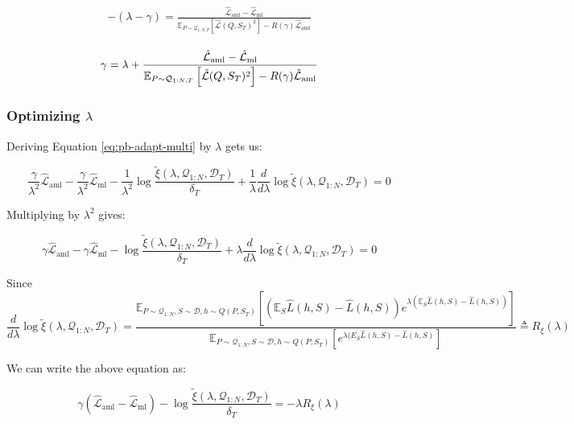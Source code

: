 \documentclass{article}
\theoremstyle{definition}
\newcommand{\Expect}[2]{\mathbb{E}_{#1}\left [#2 \right ]}
\begin{document}
\begin{align*} 
\begin{split}
-(\lambda-\gamma) = \frac{\hat{\mathcal{L}}_{\mathrm{aml}}-\hat{\mathcal{L}}_{\mathrm{ml}}}{\Expect{P\sim \mathcal{Q}_{1:N,T}}{\hat{\mathcal{L}}(Q,S_T)^2}-R(\gamma)\hat{\mathcal{L}}_{\mathrm{aml}}}
\end{split}
\end{align*}

\begin{align} \label{eq:meta-pb-gamma}
\begin{split}
\gamma = \lambda+\frac{\hat{\mathcal{L}}_{\mathrm{aml}}-\hat{\mathcal{L}}_{\mathrm{ml}}}{\Expect{P\sim \mathcal{Q}_{1:N,T}}{\hat{\mathcal{L}}(Q,S_T)^2}-R(\gamma)\hat{\mathcal{L}}_{\mathrm{aml}}}
\end{split}\hfill
\end{align}

\subsubsection{Optimizing $\lambda$}

Deriving Equation \ref{eq:pb-adapt-multi} by $\lambda$ gets us:

$$\frac{\gamma}{\lambda^2} \hat{\mathcal{L}}_{\mathrm{aml}}-\frac{\gamma}{\lambda^2}\hat{\mathcal{L}}_{\mathrm{ml}}-\frac{1}{\lambda^2}\log\frac{\tilde{\xi}(\lambda,\mathcal{Q}_{1:N},\mathcal{D}_T)}{\delta_T}+\frac{1}{\lambda}\frac{d}{d\lambda}\log\tilde{\xi}(\lambda,\mathcal{Q}_{1:N},\mathcal{D}_T)=0$$

Multiplying by $\lambda^2$ gives:

$$\gamma \hat{\mathcal{L}}_{\mathrm{aml}}-\gamma\hat{\mathcal{L}}_{\mathrm{ml}}-\log\frac{\tilde{\xi}(\lambda,\mathcal{Q}_{1:N},\mathcal{D}_T)}{\delta_T}+\lambda\frac{d}{d\lambda}\log\tilde{\xi}(\lambda,\mathcal{Q}_{1:N},\mathcal{D}_T)=0$$

Since 
$$\frac{d}{d\lambda}\log\tilde{\xi}(\lambda,\mathcal{Q}_{1:N},\mathcal{D}_T)=\frac{\Expect{P\sim \mathcal{Q}_{1:N},S\sim \mathcal{D},h\sim Q(P,S_T)}{(\mathbb{E}_S\hat{L}(h, S)-\hat{L}(h, S))e^{\lambda(\mathbb{E}_S\hat{L}(h, S)-\hat{L}(h, S))} }}{\Expect{P\sim \mathcal{Q}_{1:N},S\sim \mathcal{D},h\sim Q(P,S_T)}{e^{\lambda(E_S\hat{L}(h, S)-\hat{L}(h, S)} }}\triangleq R_\xi(\lambda)$$

We can write the above equation as:

$$\gamma(\hat{\mathcal{L}}_{\mathrm{aml}}-\hat{\mathcal{L}}_{\mathrm{ml}})-\log\frac{\tilde{\xi}(\lambda,\mathcal{Q}_{1:N},\mathcal{D}_T)}{\delta_T}=-\lambda R_\xi(\lambda)$$
\end{document}
